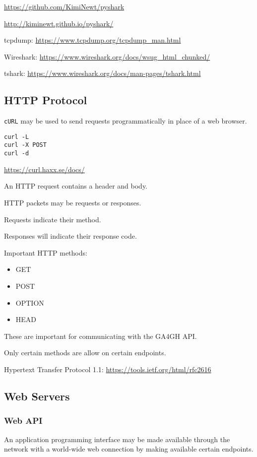 \documentclass{article}
\begin{document}
\url{https://github.com/KimiNewt/pyshark}

\url{http://kiminewt.github.io/pyshark/}

tcpdump: \url{https://www.tcpdump.org/tcpdump_man.html}

Wireshark: \url{https://www.wireshark.org/docs/wsug_html_chunked/}

tshark: \url{https://www.wireshark.org/docs/man-pages/tshark.html}

\subsection{HTTP Protocol}

\texttt{cURL} may be used to send requests programmatically in place of a web browser.
\begin{verbatim}
curl -L
curl -X POST
curl -d 
\end{verbatim}

\url{https://curl.haxx.se/docs/}

An HTTP request contains a header and body.

HTTP packets may be requests or responses.

Requests indicate their method.

Responses will indicate their response code.

Important HTTP methods:
\begin{itemize}
\item GET
\item POST
\item OPTION
\item HEAD
\end{itemize}
These are important for communicating with the GA4GH API.

Only certain methods are allow on certain endpoints.

Hypertext Transfer Protocol 1.1:
\url{https://tools.ietf.org/html/rfc2616}

\subsection{Web Servers}

\subsubsection{Web API}

An application programming interface may be made available through 
the network with a world-wide web connection by making available 
certain endpoints.
\end{document}
